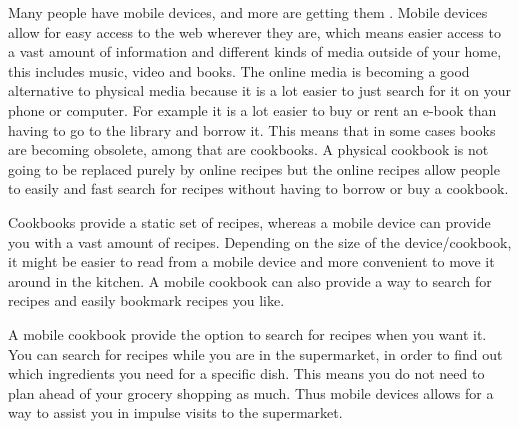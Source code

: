 Many people have mobile devices, and more are getting them . Mobile devices allow for easy access to the web wherever they are, which means easier access to a vast amount of information and different kinds of media outside of your home, this includes music, video and books. The online media is becoming a good alternative to physical media because it is a lot easier to just search for it on your phone or computer. For example it is a lot easier to buy or rent an e-book than having to go to the library and borrow it. This means that in some cases books are becoming obsolete, among that are cookbooks. A physical cookbook is not going to be replaced purely by online recipes but the online recipes allow people to easily and fast search for recipes without having to borrow or buy a cookbook.

Cookbooks provide a static set of recipes, whereas a mobile device can provide you with a vast amount of recipes. Depending on the size of the device/cookbook, it might be easier to read from a mobile device and more convenient to move it around in the kitchen. A mobile cookbook can also provide a way to search for recipes and easily bookmark recipes you like.

A mobile cookbook provide the option to search for recipes when you want it. You can search for recipes while you are in the supermarket, in order to find out which ingredients you need for a specific dish. This means you do not need to plan ahead of your grocery shopping as much. Thus mobile devices allows for a way to assist you in impulse visits to the supermarket.

